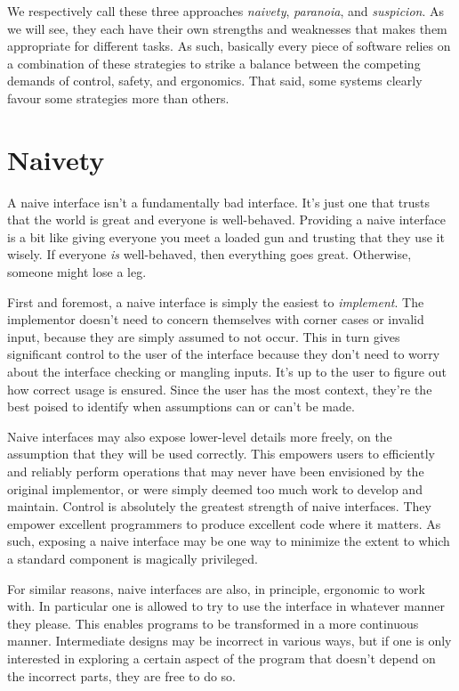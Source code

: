 We respectively call these three approaches \emph{naivety}, \emph{paranoia}, and \emph{suspicion}.
As we will see, they each have their own strengths and weaknesses that makes them appropriate
for different tasks. As such, basically every piece of software relies on a combination
of these strategies to strike a balance between the competing demands of control, safety,
and ergonomics. That said, some systems clearly favour some strategies more than others.



\section{Naivety}

A naive interface isn't a fundamentally bad interface. It's just one that trusts
that the world is great and everyone is well-behaved. Providing a naive interface
is a bit like giving everyone you meet a loaded gun and trusting that they use
it wisely. If everyone \emph{is} well-behaved, then everything goes great. Otherwise,
someone might lose a leg.

First and foremost, a naive interface
is simply the easiest to \emph{implement}. The implementor doesn't need to concern
themselves with corner cases or invalid input, because they are simply assumed to not occur. This
in turn gives significant control to the user of the interface because they don't
need to worry about the interface checking or mangling inputs. It's up to the user
to figure out how correct usage is ensured. Since the user has the most context,
they're the best poised to identify when assumptions can or can't be made.

Naive interfaces may also expose lower-level details more freely, on the
assumption that they will be used correctly. This empowers users to efficiently
and reliably perform operations that may never have been envisioned by the
original implementor, or were simply deemed too much work to develop and maintain.
Control is absolutely the greatest strength of naive interfaces. They empower
excellent programmers to produce excellent code where it matters. As such,
exposing a naive interface may be one way to minimize the extent to which a
standard component is magically privileged.

For similar reasons, naive interfaces are also, in principle, ergonomic to work
with. In particular one is allowed to try to use the interface in whatever
manner they please. This enables programs to be transformed in a more continuous
manner. Intermediate designs may be incorrect in various ways, but if one is
only interested in exploring a certain aspect of the program that doesn't depend
on the incorrect parts, they are free to do so.

